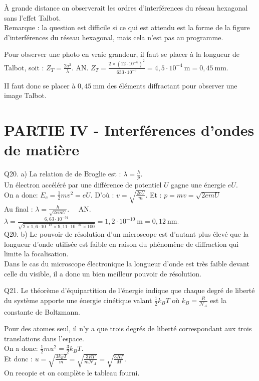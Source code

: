 \documentclass[10pt]{article}
\begin{document}
À grande distance on observerait les ordres d'interférences du réseau hexagonal sans l'effet Talbot.\\
Remarque : la question est difficile si ce qui est attendu est la forme de la figure d'interférences du réseau hexagonal, mais cela n'est pas au programme.

Pour observer une photo en vraie grandeur, il faut se placer à la longueur de Talbot, soit : \(Z_{T}=\frac{2 a^{2}}{\lambda}\). AN. \(Z_{T}=\frac{2 \times\left(12 \cdot 10^{-6}\right)^{2}}{633 \cdot 10^{-9}}=4,5 \cdot 10^{-4} \mathrm{~m}=0,45 \mathrm{~mm}\).

II faut donc se placer à \(0,45 \mathrm{~mm}\) des éléments diffractant pour observer une image Talbot.

\section*{PARTIE IV - Interférences d'ondes de matière}
Q20. a) La relation de de Broglie est : \(\lambda=\frac{h}{p}\).\\
Un électron accéléré par une différence de potentiel \(U\) gagne une énergie \(e U\).\\
On a donc: \(E_{c}=\frac{1}{2} m v^{2}=e U\). D'où : \(v=\sqrt{\frac{2 e U}{m}}\). Et : \(p=m v=\sqrt{2 e m U}\)\\
Au final : \(\lambda=\frac{h}{\sqrt{2 e m U}} . \quad\) AN. \(\lambda=\frac{6,63 \cdot 10^{-34}}{\sqrt{2 \times 1,6 \cdot 10^{-19} \times 9,11 \cdot 10^{-31} \times 100}}=1,2 \cdot 10^{-10} \mathrm{~m}=0,12 \mathrm{~nm}\).\\
Q20. b) Le pouvoir de résolution d'un microscope est d'autant plus élevé que la longueur d'onde utilisée est faible en raison du phénomène de diffraction qui limite la focalisation.\\
Dans le cas du microscope électronique la longueur d'onde est très faible devant celle du visible, il a donc un bien meilleur pouvoir de résolution.

Q21. Le théorème d'équipartition de l'énergie indique que chaque degré de liberté du système apporte une énergie cinétique valant \(\frac{1}{2} k_{B} T\) où \(k_{B}=\frac{R}{\mathcal{N}_{A}}\) est la constante de Boltzmann.

Pour des atomes seul, il n'y a que trois degrés de liberté correspondant aux trois translations dans l'espace.\\
On a donc: \(\frac{1}{2} m u^{2}=\frac{3}{2} k_{B} T\).\\
Et donc : \(u=\sqrt{\frac{3 k_{B} T}{m}}=\sqrt{\frac{3 R T}{m \mathcal{N}_{A}}}=\sqrt{\frac{3 R T}{M}}\).\\
On recopie et on complète le tableau fourni.
\end{document}
